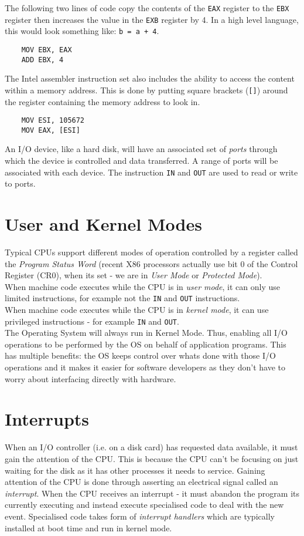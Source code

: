 The following two lines of code copy the contents of the \verb|EAX| register to the \verb|EBX| register then increases the value in the \verb|EXB| register by 4. In a high level language, this would look something like: \verb|b = a + 4|.
\begin{verbatim}
    MOV EBX, EAX
    ADD EBX, 4
\end{verbatim}
The Intel assembler instruction set also includes the ability to access the content within a memory address. This is done by putting square brackets (\verb|[]|) around the register containing the memory address to look in.
\begin{verbatim}
    MOV ESI, 105672
    MOV EAX, [ESI]
\end{verbatim}

An I/O device, like a hard disk, will have an associated set of \textit{ports} through which the device is controlled and data transferred. A range of ports will be associated with each device. The instruction \verb|IN| and \verb|OUT| are used to read or write to ports. 

\section{User and Kernel Modes}
Typical CPUs support different modes of operation controlled by a register called the \textit{Program Status Word} (recent X86 processors actually use bit 0 of the Control Register (CR0), when its set - we are in \textit{User Mode} or \textit{Protected Mode}).\\

When machine code executes while the CPU is in \textit{user mode}, it can only use limited instructions, for example not the \verb|IN| and \verb|OUT| instructions.\\

When machine code executes while the CPU is in \textit{kernel mode}, it can use privileged instructions - for example \verb|IN| and \verb|OUT|.\\

The Operating System will always run in Kernel Mode. Thus, enabling all I/O operations to be performed by the OS on behalf of application programs. This has multiple benefits: the OS keeps control over whats done with those I/O operations and it makes it easier for software developers as they don't have to worry about interfacing directly with hardware.

\section{Interrupts}
When an I/O controller (i.e. on a disk card) has requested data available, it must gain the attention of the CPU. This is because the CPU can't be focusing on just waiting for the disk as it has other processes it needs to service. Gaining attention of the CPU is done through asserting an electrical signal called an \textit{interrupt}. When the CPU receives an interrupt - it must abandon the program its currently executing and instead execute specialised code to deal with the new event. Specialised code takes form of \textit{interrupt handlers} which are typically installed at boot time and run in kernel mode.\\

